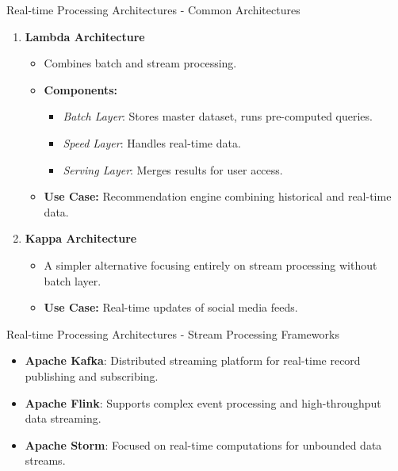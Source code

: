 \documentclass[aspectratio=169]{beamer}
\begin{document}
\begin{frame}[fragile]{Real-time Processing Architectures - Common Architectures}
    \begin{enumerate}
        \item \textbf{Lambda Architecture}
        \begin{itemize}
            \item Combines batch and stream processing.
            \item \textbf{Components:}
                \begin{itemize}
                    \item \textit{Batch Layer}: Stores master dataset, runs pre-computed queries.
                    \item \textit{Speed Layer}: Handles real-time data.
                    \item \textit{Serving Layer}: Merges results for user access.
                \end{itemize}
            \item \textbf{Use Case:} Recommendation engine combining historical and real-time data.
        \end{itemize}
        
        \item \textbf{Kappa Architecture}
        \begin{itemize}
            \item A simpler alternative focusing entirely on stream processing without batch layer.
            \item \textbf{Use Case:} Real-time updates of social media feeds.
        \end{itemize}
    \end{enumerate}
\end{frame}

\begin{frame}[fragile]{Real-time Processing Architectures - Stream Processing Frameworks}
    \begin{itemize}
        \item \textbf{Apache Kafka}: Distributed streaming platform for real-time record publishing and subscribing.
        \item \textbf{Apache Flink}: Supports complex event processing and high-throughput data streaming.
        \item \textbf{Apache Storm}: Focused on real-time computations for unbounded data streams.
    \end{itemize}
\end{frame}
\end{document}
